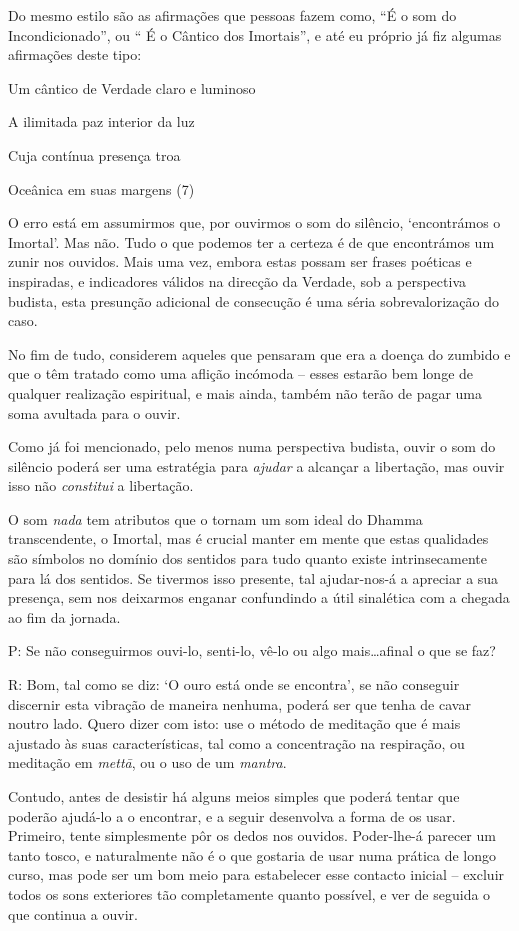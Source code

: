 Do mesmo estilo são as afirmações que pessoas fazem como, ``É o som do
Incondicionado'', ou `` É o Cântico dos Imortais'', e até eu próprio já
fiz algumas afirmações deste tipo:

Um cântico de Verdade claro e luminoso

A ilimitada paz interior da luz

Cuja contínua presença troa

Oceânica em suas margens (7)

O erro está em assumirmos que, por ouvirmos o som do silêncio,
`encontrámos o Imortal'. Mas não. Tudo o que podemos ter a certeza é de
que encontrámos um zunir nos ouvidos. Mais uma vez, embora estas possam
ser frases poéticas e inspiradas, e indicadores válidos na direcção da
Verdade, sob a perspectiva budista, esta presunção adicional de
consecução é uma séria sobrevalorização do caso.

No fim de tudo, considerem aqueles que pensaram que era a doença do
zumbido e que o têm tratado como uma aflição incómoda -- esses estarão
bem longe de qualquer realização espiritual, e mais ainda, também não
terão de pagar uma soma avultada para o ouvir.

Como já foi mencionado, pelo menos numa perspectiva budista, ouvir o som
do silêncio poderá ser uma estratégia para \emph{ajudar} a alcançar a
libertação, mas ouvir isso não \emph{constitui} a libertação.

O som \emph{nada} tem atributos que o tornam um som ideal do Dhamma
transcendente, o Imortal, mas é crucial manter em mente que estas
qualidades são símbolos no domínio dos sentidos para tudo quanto existe
intrinsecamente para lá dos sentidos. Se tivermos isso presente, tal
ajudar-nos-á a apreciar a sua presença, sem nos deixarmos enganar
confundindo a útil sinalética com a chegada ao fim da jornada.

P: Se não conseguirmos ouvi-lo, senti-lo, vê-lo ou algo
mais\ldots{}afinal o que se faz?

R: Bom, tal como se diz: `O ouro está onde se encontra', se não
conseguir discernir esta vibração de maneira nenhuma, poderá ser que
tenha de cavar noutro lado. Quero dizer com isto: use o método de
meditação que é mais ajustado às suas características, tal como a
concentração na respiração, ou meditação em \emph{mettā}, ou o uso de um
\emph{mantra}.

Contudo, antes de desistir há alguns meios simples que poderá tentar que
poderão ajudá-lo a o encontrar, e a seguir desenvolva a forma de os
usar. Primeiro, tente simplesmente pôr os dedos nos ouvidos. Poder-lhe-á
parecer um tanto tosco, e naturalmente não é o que gostaria de usar numa
prática de longo curso, mas pode ser um bom meio para estabelecer esse
contacto inicial -- excluir todos os sons exteriores tão completamente
quanto possível, e ver de seguida o que continua a ouvir.


